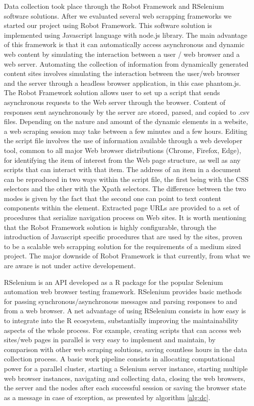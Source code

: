 \documentclass[]{article}
\begin{document}
Data collection took place through the Robot Framework and RSelenium software solutions. 
After we evaluated several web scrapping frameworks we started our project using Robot Framework. This software solution is implemented using Javascript language with node.js library.
The main advantage of this framework is that it can automatically access asynchronous and dynamic web content by simulating the interaction between a user / web browser and a web server. Automating the collection of information from dynamically generated content sites involves simulating the interaction between the user/web browser and the server through a headless browser application, in this case phantom.js. The Robot Framework solution allows user to set up a script that sends asynchronous requests to the Web server through the browser. Content of responses sent asynchronously by the server are stored, parsed, and copied to .csv files. Depending on the nature and amount of the dynamic elements in a website, a web scraping session may take between a few minutes and a few hours.
Editing the script file involves the use of information available through a web developer tool, common to all major Web browser distributions (Chrome, Firefox, Edge), for identifying the item of interest from the Web page structure, as well as any scripts that can interact with that item. The address of an item in a document can be reproduced in two ways within the script file, the first being with the CSS selectors and the other with the Xpath selectors. The difference between the two modes is given by the fact that the second one can point to text content components within the element. Extracted page URLs are provided to a set of procedures that serialize navigation process on Web sites. It is worth mentioning that the Robot Framework solution is highly configurable, through the introduction of Javascript specific procedures that are used by the sites, proven to be a scalable web scrapping solution for the requirements of a medium sized project. The major downside of Robot Framework is that currently, from what we are aware is not under active developement.

RSelenium is an API developed as a R package for the popular Selenium automation web browser testing framework. RSelenium provides basic methods for passing synchronous/asynchronous messages and parsing responses to and from a web browser. A net advantage of using RSelenium consists in how easy is to integrate into the R ecosystem, substantially improving the maintainability aspects of the whole process. For example, creating scripts that can access web sites/web pages in parallel \cite{dopar, foreach} is very easy to implement and maintain, by comparison with other web scraping solutions, saving countless hours in the data collection process. A basic work pipeline consists in allocating computational power for a parallel cluster, starting a Selenium server instance, starting multiple web browser instances, navigating and collecting data, closing the web browsers, the server and the nodes after each successful session or saving the browser state as a message in case of exception, as presented by algorithm \ref{alg:dc}.   
\end{document}
